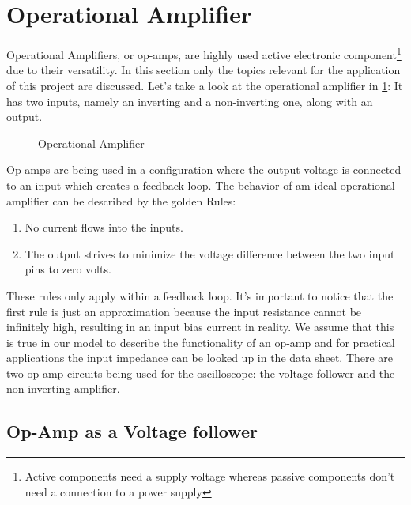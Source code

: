 \section{Operational Amplifier}

Operational Amplifiers, or op-amps, are highly used active electronic component\footnote{Active components need a supply voltage whereas passive components don't need a connection to a power supply} due to their versatility. In this section only the topics relevant for the application of this project are discussed. Let's take a look at the operational amplifier in \cref{fig:op_amp}: It has two inputs, namely an inverting and a non-inverting one, along with an output.

\begin{figure}[htb]
	\centering
	\caption{Operational Amplifier}
	\label{fig:op_amp}
\end{figure}

Op-amps are being used in a configuration where the output voltage is connected to an input which creates a feedback loop. The behavior of am ideal operational amplifier can be described by the \glqq{}golden Rules\grqq{}:
\begin{enumerate}
	\item No current flows into the inputs.
	\item The output strives to minimize the voltage difference between the two input pins to zero volts.
\end{enumerate}

These rules only apply within a feedback loop. It's important to notice that the first rule is just an approximation because the input resistance cannot be infinitely high, resulting in an input bias current in reality. We assume that this is true in our model to describe the functionality of an op-amp and for practical applications the input impedance can be looked up in the data sheet. There are two op-amp circuits being used for the oscilloscope: the voltage follower and the non-inverting amplifier.

\subsection{Op-Amp as a Voltage follower}

